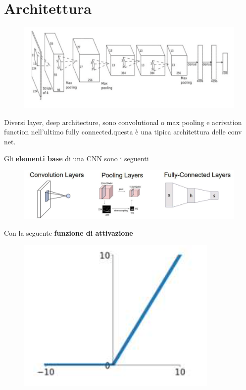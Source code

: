 \section{Architettura}
\begin{figure}[!h]
    \includegraphics[scale=.5]{images/cnn/arch01.png}
    \centering
\end{figure}



Diversi layer, deep architecture, sono convolutional o max pooling e acrivation function nell'ultimo fully connected.questa è una tipica architettura delle conv net.


Gli \textbf{elementi base} di una CNN sono i seguenti
\begin{figure}[!h]
    \includegraphics[scale=.45]{images/cnn/arch02.png}
    \centering
\end{figure}


Con la seguente \textbf{funzione di attivazione}
\begin{figure}[!h]
    \includegraphics[scale=1]{images/cnn/act_fun.png}
    \centering
\end{figure}
\newpage
